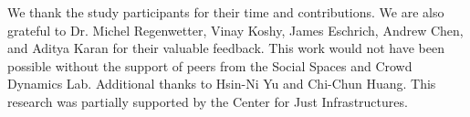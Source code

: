 \begin{acks}
We thank the study participants for their time and contributions. We are also grateful to Dr. Michel Regenwetter, Vinay Koshy, James Eschrich, Andrew Chen, and Aditya Karan for their valuable feedback. This work would not have been possible without the support of peers from the Social Spaces and Crowd Dynamics Lab. Additional thanks to Hsin-Ni Yu and Chi-Chun Huang. This research was partially supported by the Center for Just Infrastructures.
\end{acks}


